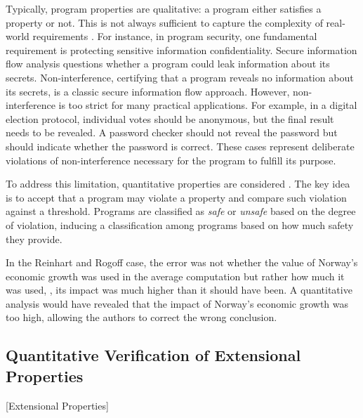 Typically, program properties are qualitative: a program either satisfies a property or not.
This is not always sufficient to capture the complexity of real-world requirements .
For instance, in program security, one fundamental requirement is protecting sensitive information confidentiality.
Secure information flow analysis questions whether a program could leak information about its secrets.
Non-interference, certifying that a program reveals no information about its secrets, is a classic secure information flow approach.
However, non-interference is too strict for many practical applications.
For example, in a digital election protocol, individual votes should be anonymous, but the final result needs to be revealed.
A password checker should not reveal the password but should indicate whether the password is correct.
These cases represent deliberate violations of non-interference necessary for the program to fulfill its purpose.

To address this limitation, quantitative properties are considered .
The key idea is to accept that a program may violate a property and compare such violation against a threshold.
Programs are classified as \emph{safe} or \emph{unsafe} based on the degree of violation, inducing a classification among programs based on how much safety they provide.

In the Reinhart and Rogoff case,
the error was not whether
the value of Norway's economic growth
was used
in the average computation
but rather how much it was used, \ie,
its impact was much higher than it should have been.
A quantitative analysis would have revealed that the impact of Norway's economic growth was too high, allowing the authors to correct the wrong conclusion.

\subsection{Quantitative Verification of Extensional Properties}[Extensional Properties]


